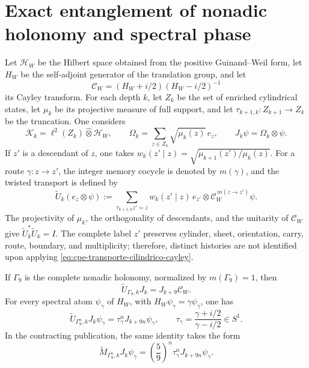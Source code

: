 
\section{Exact entanglement of nonadic holonomy and spectral phase}
\label{sec:cpe-entrelazamiento-exacto}

Let \(\mathcal H_W\) be the Hilbert space obtained from the positive
Guinand--Weil form, let \(H_W\) be the self-adjoint generator of the
translation group, and let
\[
 \mathcal C_W=(H_W+i/2)(H_W-i/2)^{-1}
\]
its Cayley transform. For each depth \(k\), let \(Z_k\) be the
set of enriched cylindrical states, let \(\mu_k\) be its
projective measure of full support, and let
\(\tau_{k+1,k}:Z_{k+1}\to Z_k\) be the truncation. One considers
\[
 \mathscr K_k=\ell^2(Z_k)\widehat\otimes\mathcal H_W,
 \qquad
 \Omega_k=\sum_{z\in Z_k}\sqrt{\mu_k(z)}\,e_z,
 \qquad
 J_k\psi=\Omega_k\otimes\psi.
\]
If \(z'\) is a descendant of \(z\), one takes
\(w_k(z'\mid z)=\sqrt{\mu_{k+1}(z')/\mu_k(z)}\). For a route
\(\gamma:z\to z'\), the integer memory cocycle is denoted by
\(m(\gamma)\), and the twisted transport is defined by
\begin{equation}
 \widetilde U_k(e_z\otimes\psi)
 :=\sum_{\tau_{k+1,k}z'=z}
 w_k(z'\mid z)\,e_{z'}\otimes
 \mathcal C_W^{\,m(z\to z')}\psi.
 \label{eq:cpe-transporte-cilindrico-cayley}
\end{equation}
The projectivity of \(\mu_k\), the orthogonality of descendants, and the
unitarity of \(\mathcal C_W\) give
\(\widetilde U_k^*\widetilde U_k=I\). The complete label \(z'\)
preserves cylinder, sheet, orientation, carry, route, boundary, and
multiplicity; therefore, distinct histories are not identified upon applying
\eqref{eq:cpe-transporte-cilindrico-cayley}.

\begin{theorem}
\label{thm:cpe-entrelazamiento-cayley-tpk}
If \(\Gamma_9\) is the complete nonadic holonomy, normalized by
\(m(\Gamma_9)=1\), then
\begin{equation}
 \boxed{\widetilde U_{\Gamma_9,k}J_k
 =J_{k+9}\mathcal C_W.}
 \label{eq:cpe-entrelazamiento-exacto}
\end{equation}
For every spectral atom \(\psi_\gamma\) of \(H_W\), with
\(H_W\psi_\gamma=\gamma\psi_\gamma\), one has
\begin{equation}
 \widetilde U_{\Gamma_9^n,k}J_k\psi_\gamma
 =\tau_\gamma^nJ_{k+9n}\psi_\gamma,
 \qquad
 \tau_\gamma=\frac{\gamma+i/2}{\gamma-i/2}\in S^1.
 \label{eq:cpe-orbita-espectral-ledger}
\end{equation}
In the contracting publication, the same identity takes the form
\[
 \widetilde M_{\Gamma_9^n,k}J_k\psi_\gamma
 =\left(\frac59\right)^n\tau_\gamma^n
 J_{k+9n}\psi_\gamma.
\]
\end{theorem}

